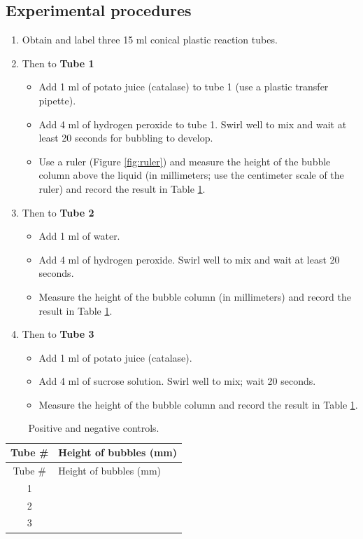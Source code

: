 \documentclass[]{book}
\providecommand{\tightlist}{%
  \setlength{\itemsep}{0pt}\setlength{\parskip}{0pt}}
\theoremstyle{definition}
\theoremstyle{definition}
\theoremstyle{definition}
\theoremstyle{remark}
\begin{document}
\subsection{Experimental procedures}\label{experimental-procedures-20}

\begin{enumerate}
\def\labelenumi{\arabic{enumi}.}
\tightlist
\item
  Obtain and label three 15 ml conical plastic reaction tubes.
\item
  Then to \textbf{Tube 1}

  \begin{itemize}
  \tightlist
  \item
    Add 1 ml of potato juice (catalase) to tube 1 (use a plastic
    transfer pipette).
  \item
    Add 4 ml of hydrogen peroxide to tube 1. Swirl well to mix and wait
    at least 20 seconds for bubbling to develop.
  \item
    Use a ruler (Figure \ref{fig:ruler}) and measure the height of the
    bubble column above the liquid (in millimeters; use the centimeter
    scale of the ruler) and record the result in Table
    \ref{tab:control}.
  \end{itemize}
\item
  Then to \textbf{Tube 2}

  \begin{itemize}
  \tightlist
  \item
    Add 1 ml of water.
  \item
    Add 4 ml of hydrogen peroxide. Swirl well to mix and wait at least
    20 seconds.
  \item
    Measure the height of the bubble column (in millimeters) and record
    the result in Table \ref{tab:control}.
  \end{itemize}
\item
  Then to \textbf{Tube 3}

  \begin{itemize}
  \tightlist
  \item
    Add 1 ml of potato juice (catalase).
  \item
    Add 4 ml of sucrose solution. Swirl well to mix; wait 20 seconds.
  \item
    Measure the height of the bubble column and record the result in
    Table \ref{tab:control}.
  \end{itemize}
\end{enumerate}

\begin{longtable}[]{@{}cl@{}}
\caption{\label{tab:control} Positive and negative controls.}\tabularnewline
\toprule
Tube \# & Height of bubbles (mm)\tabularnewline
\midrule
\endfirsthead
\toprule
Tube \# & Height of bubbles (mm)\tabularnewline
\midrule
\endhead
1 &\tabularnewline
2 &\tabularnewline
3 &\tabularnewline
\bottomrule
\end{longtable}
\end{document}
